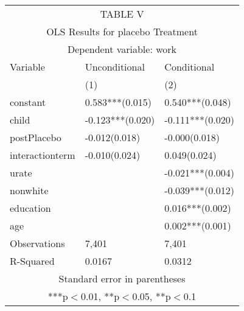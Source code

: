 \begin{tabular}[H]{ |p{4cm}p{4cm}p{4cm}|}
 \hline
 \multicolumn{3}{|c|}{TABLE V} \\
 \multicolumn{3}{|c|}{OLS Results for placebo Treatment} \\
 \hline
 \multicolumn{3}{|c|}{Dependent variable: work} \\
 \hline
   Variable &Unconditional & Conditional\\
  & (1) & (2) \\

constant& 0.583***(0.015)&0.540***(0.048)\\
child&-0.123***(0.020)&-0.111***(0.020)\\
postPlacebo& -0.012(0.018)&-0.000(0.018)\\
interactionterm& -0.010(0.024)&0.049(0.024)\\
urate&&-0.021***(0.004)\\
nonwhite&&-0.039***(0.012)\\
education&&0.016***(0.002)\\
age&&0.002***(0.001)\\
Observations&7,401&7,401\\
R-Squared&0.0167&0.0312\\
\hline
\multicolumn{3}{c}{Standard error in parentheses} \\
\multicolumn{3}{c}{***p$<$0.01, **p$<$0.05, **p$<$0.1} \\

\end{tabular}